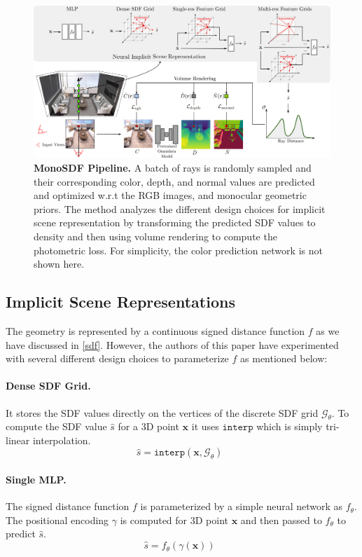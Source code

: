 \documentclass[a4paper]{paper}
\begin{document}
\begin{figure}[!htb]
    \centering
    \includegraphics[width=\textwidth]{overview}
    \caption{\textbf{MonoSDF Pipeline.} A batch of rays is randomly sampled and their corresponding color, depth, and normal values are predicted and optimized w.r.t the RGB images, and monocular geometric priors. The method analyzes the different design choices for implicit scene representation by transforming the predicted SDF values to density and then using volume rendering to compute the photometric loss. For simplicity, the color prediction network is not shown here.}
    \label{overview}
    \vspace{-0.4cm}
\end{figure}

\subsection{Implicit Scene Representations}\label{representation}
The geometry is represented by a continuous signed distance function $f$ as we have discussed in \ref{sdf}. However, the authors of this paper have experimented with several different design choices to parameterize $f$ as mentioned below:
\paragraph{Dense SDF Grid.}  It stores the SDF values directly on the vertices of the discrete SDF grid $\mathcal{G}_\theta$. To compute the SDF value $\hat{s}$ for a 3D point $\mathbf{x}$ it uses $\texttt{interp}$ which is simply tri-linear interpolation.
\begin{equation}
\hat{s} = \texttt{interp}(\mathbf{x}, \mathcal{G}_\theta) \enspace 
\label{eq:dense}
\end{equation}

\paragraph{Single MLP.} The signed distance function $f$ is parameterized by a simple neural network as $f_\theta$. The positional encoding $\gamma$ is computed for 3D point $\mathbf{x}$ and then passed to $f_\theta$ to predict $\hat{s}$.
\begin{equation}
\hat{s} = f_\theta( \gamma(\mathbf{x})) \enspace 
\label{eq:f_mlp}
\end{equation}
\end{document}
